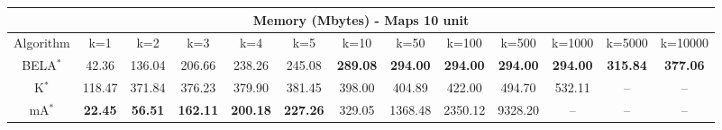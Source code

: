 \begin{tabular}{c|cccccccccccc}\toprule
\multicolumn{13}{c}{Memory (Mbytes) - Maps 10 unit}\\ \midrule
Algorithm & k=1 & k=2 & k=3 & k=4 & k=5 & k=10 & k=50 & k=100 & k=500 & k=1000 & k=5000 & k=10000 \\ \midrule
BELA$^*$ & 42.36 & 136.04 & 206.66 & 238.26 & 245.08 & \textbf{289.08} & \textbf{294.00} & \textbf{294.00} & \textbf{294.00} & \textbf{294.00} & \textbf{315.84} & \textbf{377.06} \\
K$^*$ & 118.47 & 371.84 & 376.23 & 379.90 & 381.45 & 398.00 & 404.89 & 422.00 & 494.70 & 532.11 & -- & -- \\
mA$^*$ & \textbf{22.45} & \textbf{56.51} & \textbf{162.11} & \textbf{200.18} & \textbf{227.26} & 329.05 & 1368.48 & 2350.12 & 9328.20 & -- & -- & -- \\ \bottomrule 
\end{tabular}

